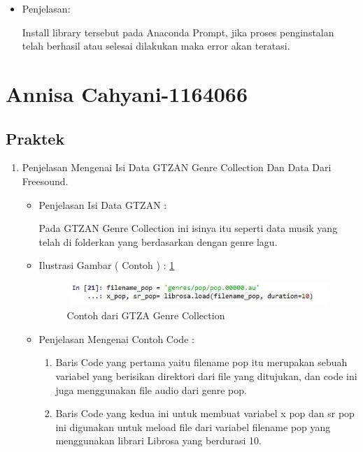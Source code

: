 \begin{enumerate}
\begin{itemize}
\item Penjelasan:

 Install library tersebut pada Anaconda Prompt, jika proses penginstalan telah berhasil atau selesai dilakukan maka error akan teratasi.

\end{itemize}

\end{enumerate}

\section{Annisa Cahyani-1164066}
\subsection{Praktek}
\begin{enumerate}
\item Penjelasan Mengenai Isi Data GTZAN Genre Collection Dan Data Dari Freesound.
\begin{itemize}
\item Penjelasan Isi Data GTZAN :
\par Pada GTZAN Genre Collection ini isinya itu seperti data musik yang telah di folderkan yang berdasarkan dengan genre lagu.
\par
\item Ilustrasi Gambar ( Contoh ) : \ref{cahya-chapter6-1}
\par
\begin{figure}[!hbtp]
\centering
\includegraphics[scale=0.2]{figures/cahya-chapter6-1.jpg}
\caption{Contoh dari GTZA Genre Collection}
\label{cahya-chapter6-1}
\end{figure}
\par
\item Penjelasan Mengenai Contoh Code :
\begin{enumerate}
\item Baris Code yang pertama yaitu filename pop itu merupakan sebuah variabel yang berisikan direktori dari file yang ditujukan, dan code ini juga menggunakan file audio dari genre pop.
\item Baris Code yang kedua ini untuk membuat variabel x pop dan sr pop ini digunakan untuk meload file dari variabel filename pop yang menggunakan librari Librosa yang berdurasi 10.
\end{enumerate}

\end{itemize}
\end{enumerate}
